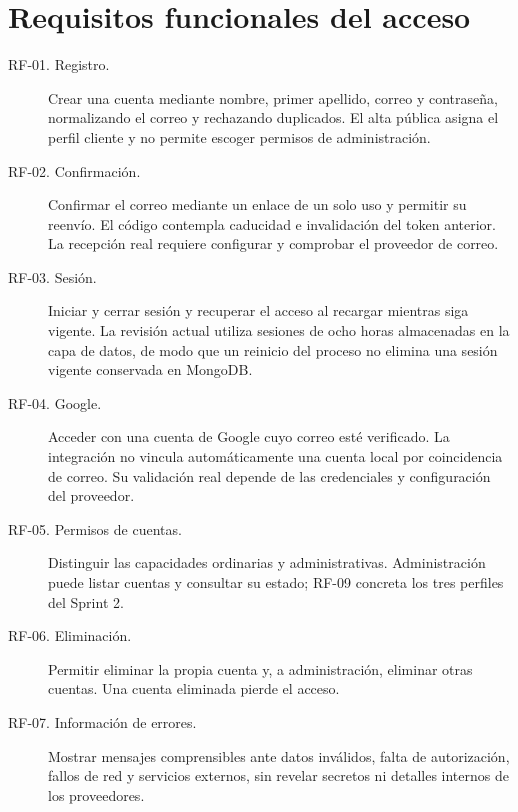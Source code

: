 \section{Requisitos funcionales del acceso}
\begin{description}
\item[RF-01. Registro.] Crear una cuenta mediante nombre, primer apellido, correo y contraseña, normalizando el correo y rechazando duplicados. El alta pública asigna el perfil cliente y no permite escoger permisos de administración.
\item[RF-02. Confirmación.] Confirmar el correo mediante un enlace de un solo uso y permitir su reenvío. El código contempla caducidad e invalidación del token anterior. La recepción real requiere configurar y comprobar el proveedor de correo.
\item[RF-03. Sesión.] Iniciar y cerrar sesión y recuperar el acceso al recargar mientras siga vigente. La revisión actual utiliza sesiones de ocho horas almacenadas en la capa de datos, de modo que un reinicio del proceso no elimina una sesión vigente conservada en MongoDB.
\item[RF-04. Google.] Acceder con una cuenta de Google cuyo correo esté verificado. La integración no vincula automáticamente una cuenta local por coincidencia de correo. Su validación real depende de las credenciales y configuración del proveedor.
\item[RF-05. Permisos de cuentas.] Distinguir las capacidades ordinarias y administrativas. Administración puede listar cuentas y consultar su estado; RF-09 concreta los tres perfiles del Sprint 2.
\item[RF-06. Eliminación.] Permitir eliminar la propia cuenta y, a administración, eliminar otras cuentas. Una cuenta eliminada pierde el acceso.
\item[RF-07. Información de errores.] Mostrar mensajes comprensibles ante datos inválidos, falta de autorización, fallos de red y servicios externos, sin revelar secretos ni detalles internos de los proveedores.
\end{description}

